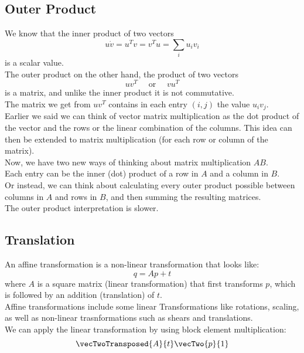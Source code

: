 \documentclass[12pt]{article}
\begin{document}
\newpage

\subsection*{Outer Product}

We know that the inner product of two vectors 
\[ u \dot v = u^Tv = v^Tu = \sum_i u_iv_i \]
is a scalar value. \\

The outer product on the other hand,
the product of two vectors
\[ uv^T \quad \text{ or } \quad vu^T \]
is a matrix, and unlike the inner product
it is not commutative. \\
The matrix we get from $uv^T$
contains in each entry $(i, j)$
the value $u_iv_j$. \\

Earlier we said we can think of vector matrix
multiplication as the dot product
of the vector and the rows or the linear combination
of the columns.
This idea can then be extended to
matrix multiplication (for each row or column
of the matrix). \\

Now, we have two new ways of thinking about matrix
multiplication $AB$. \\
Each entry can be the inner (dot) product of
a row in $A$ and a column in $B$. \\
Or instead, we can think about
calculating every outer product possible
between columns in $A$ and rows in $B$,
and then summing the resulting matrices. \\
The outer product interpretation is slower. \\

\newpage

\subsection*{Translation}

An affine transformation is a non-linear
transformation that looks like:
\[ q = Ap + t \]
where $A$ is a square matrix
(linear transformation) that first transforms $p$,
which is followed by an addition (translation) of $t$. \\
Affine transformations include
some linear Transformations
like rotations, scaling, as well as non-linear
trasnformations such as shears and translations. \\

We can apply the linear transformation
by using block element multiplication:
\[ \vecTwoTransposed{A}{t}\vecTwo{p}{1} \] \\
\end{document}
